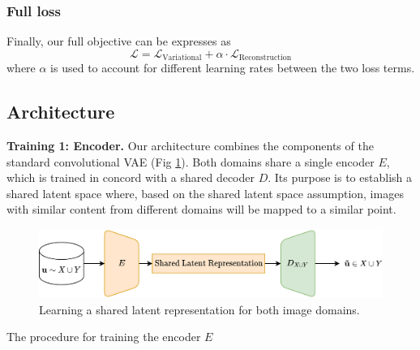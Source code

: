 \documentclass{article}
\begin{document}
\subsubsection{Full loss}
Finally, our full objective can be expresses as
\begin{equation}
  \mathcal{L}
  = \mathcal{L}_{\text{Variational}}
  + \alpha\cdot \mathcal{L}_{\text{Reconstruction}}
\end{equation}
where $\alpha$ is used to account for different learning rates between the two loss terms.
\subsection{Architecture}
\textbf{Training 1: Encoder.} Our architecture combines the components of the standard convolutional VAE (Fig \ref{fig:pretrain}). Both domains share a single encoder $E$, which is trained in concord with a shared decoder $D$. Its purpose is to establish a shared latent space where, based on the shared latent space assumption, images with similar content from different domains will be mapped to a similar point.
\begin{figure}[H]
  \centering
  \includegraphics[width=0.6\linewidth]{report/assets/pretrain.png}
  \caption{Learning a shared latent representation for both image domains.}
  \label{fig:pretrain}
  \vspace{-1cm}
\end{figure}
\begin{algorithm}
  \caption{The procedure for training the encoder $E$}\label{alg:pre-train}
  \begin{algorithmic}
    
    
    
    
  \end{algorithmic}
  \end{algorithm}
\end{document}
